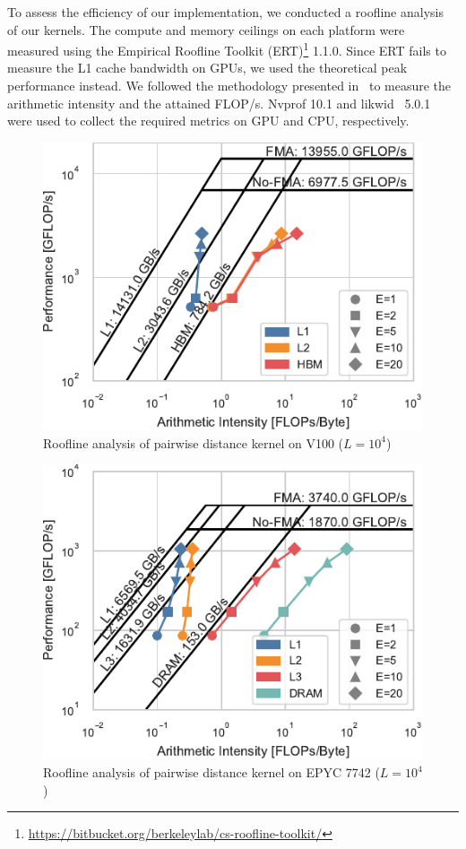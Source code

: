\documentclass[conference]{IEEEtran}
\begin{document}
To assess the efficiency of our implementation, we conducted a roofline
analysis~\cite{Williams2008} of our kernels. The compute and memory ceilings
on each platform were measured using the Empirical Roofline Toolkit (ERT)\footnote{\url{https://bitbucket.org/berkeleylab/cs-roofline-toolkit/}} 1.1.0.
Since ERT fails to measure the L1 cache bandwidth on GPUs, we used the
theoretical peak performance instead. We followed the methodology presented
in~\cite{Yang2020a,Yang2020b} to measure the arithmetic intensity and the
attained FLOP/s. Nvprof 10.1 and likwid~\cite{Treibig2010} 5.0.1 were used to
collect the required metrics on GPU and CPU, respectively.


\begin{figure}
    \centering
    \includegraphics{figs/roofline_distances_v100}
    \caption{Roofline analysis of pairwise distance kernel on V100 ($L=10^4$)}%
    \label{fig:roofline-distances-v100}
\end{figure}

\begin{figure}
    \centering
    \includegraphics{figs/roofline_distances_epyc}
    \caption{Roofline analysis of pairwise distance kernel on EPYC 7742 ($L=10^4$)}%
    \label{fig:roofline-distances-epyc}
\end{figure}
\end{document}
